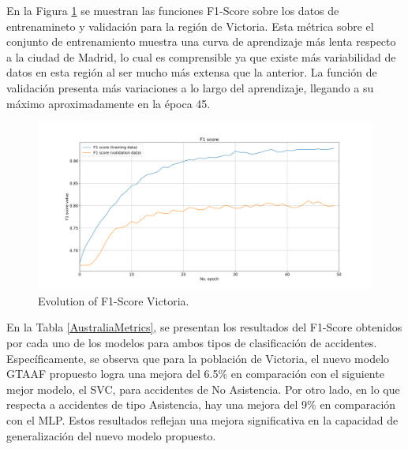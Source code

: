 \documentclass{uathesis-es}
\begin{document}
En la Figura \ref{VictoriaLossFunction} se muestran las funciones F1-Score sobre los datos de entrenamineto y validación para la región de Victoria. Esta métrica sobre el conjunto de entrenamiento muestra una curva de aprendizaje más lenta respecto a la ciudad de Madrid, lo cual es comprensible ya que existe más variabilidad de datos en esta región al ser mucho más extensa que la anterior. La función de validación presenta más variaciones a lo largo del aprendizaje, llegando a su máximo aproximadamente en la época 45.

\begin{figure}[H]
\centering
    \includegraphics[width=160mm]{Figures/Victoria/Victoria_convolution_2d_f1_score_paper.png}
    \caption{Evolution of F1-Score Victoria.}
\label{VictoriaLossFunction}
\end{figure}

En la Tabla \ref{AustraliaMetrics}, se presentan los resultados del F1-Score obtenidos por cada uno de los modelos para ambos tipos de clasificación de accidentes. Específicamente, se observa que para la población de Victoria, el nuevo modelo GTAAF propuesto logra una mejora del 6.5\% en comparación con el siguiente mejor modelo, el SVC, para accidentes de No Asistencia. Por otro lado, en lo que respecta a accidentes de tipo Asistencia, hay una mejora del 9\% en comparación con el MLP. Estos resultados reflejan una mejora significativa en la capacidad de generalización del nuevo modelo propuesto.
\end{document}
